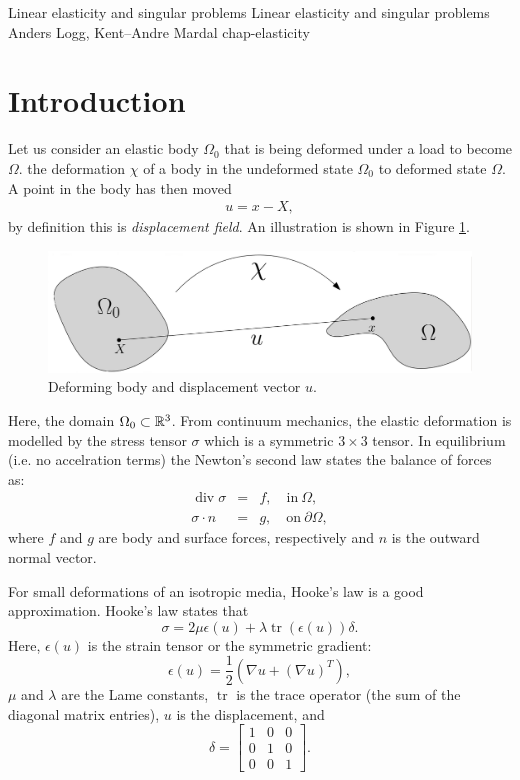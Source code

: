              {Linear elasticity and singular problems}
              {Linear elasticity and singular problems} 
              {Anders Logg, Kent--Andre Mardal} 
              {chap-elasticity}   
\label{chap-elasticity}

\section{Introduction} 

Let us consider an elastic body $\Omega_0$ that is being deformed under a load
to become $\Omega$.
the deformation $\chi$ of a body in the undeformed state $\Omega_0$ to deformed state $\Omega$. A point in the body has then moved
\begin{align}
u = x - X,
\end{align}
by definition this is \emph{displacement field}. An illustration is shown in Figure \ref{el:def}. 

\begin{figure}[h!]

\begin{center}
  \includegraphics[scale=0.25]{chapters/elasticity/displace.png}
  \end{center}
\caption{Deforming body and displacement vector $u$.}
\label{el:def}
\end{figure}

Here, the domain $\Omega_0 \subset \mathbb{R}^3$. From continuum mechanics, the elastic deformation is modelled by the stress tensor $\sigma$ which is a symmetric $3\times 3$ tensor. 
In equilibrium (i.e. no accelration terms) the Newton's second law states 
the balance of forces as: 
\begin{eqnarray*}  
\operatorname{div} \sigma &=& f, \quad\mbox{in}\ \Omega ,  \\ 
\sigma \cdot n &=& g, \quad\mbox{on}\ \partial \Omega,   
\end{eqnarray*}  
where $f$ and $g$ are body and surface forces,  respectively and $n$ is the outward normal vector.   

For small deformations of an isotropic media, Hooke's law is a good approximation. 
Hooke's law states that 
\[
\sigma = 2 \mu \epsilon(u) + \lambda \operatorname{tr}(\epsilon(u)) \delta.  
\]
Here, $\epsilon(u)$ is the strain tensor or the symmetric gradient: 
\[
\epsilon(u) = \frac{1}{2} (\nabla u + (\nabla u)^T),   
\]
$\mu$ and $\lambda$ are the Lame constants, $\operatorname{tr}$ is the trace operator (the sum of the diagonal matrix
entries), $u$ is the displacement, and  
\[
\delta = \left[ \begin{array}{ccc} 1 & 0 & 0 \\ 0 & 1 & 0 \\ 0 & 0 & 1 \end{array} \right].
\]

